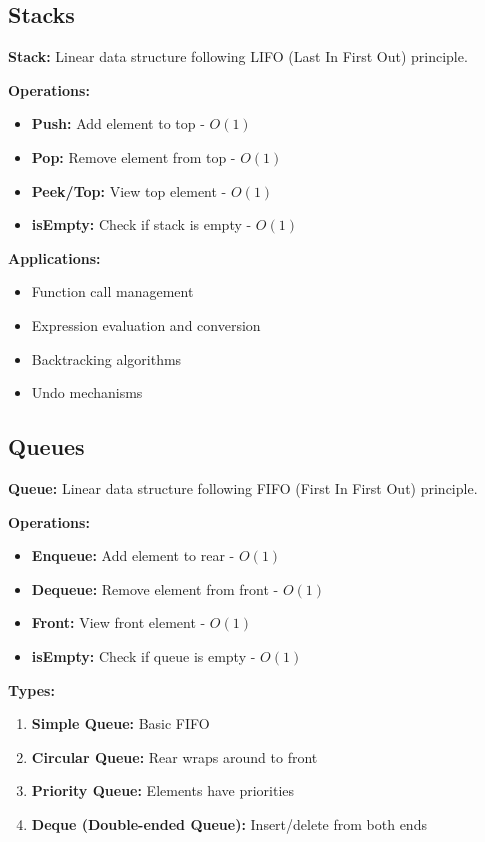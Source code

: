 \documentclass[11pt,a4paper]{article}
\begin{document}
\subsection{Stacks}

\begin{defbox}
\textbf{Stack:} Linear data structure following LIFO (Last In First Out) principle.
\end{defbox}

\textbf{Operations:}
\begin{itemize}
    \item \textbf{Push:} Add element to top - $O(1)$
    \item \textbf{Pop:} Remove element from top - $O(1)$
    \item \textbf{Peek/Top:} View top element - $O(1)$
    \item \textbf{isEmpty:} Check if stack is empty - $O(1)$
\end{itemize}

\textbf{Applications:}
\begin{itemize}
    \item Function call management
    \item Expression evaluation and conversion
    \item Backtracking algorithms
    \item Undo mechanisms
\end{itemize}

\subsection{Queues}

\begin{defbox}
\textbf{Queue:} Linear data structure following FIFO (First In First Out) principle.
\end{defbox}

\textbf{Operations:}
\begin{itemize}
    \item \textbf{Enqueue:} Add element to rear - $O(1)$
    \item \textbf{Dequeue:} Remove element from front - $O(1)$
    \item \textbf{Front:} View front element - $O(1)$
    \item \textbf{isEmpty:} Check if queue is empty - $O(1)$
\end{itemize}

\textbf{Types:}
\begin{enumerate}
    \item \textbf{Simple Queue:} Basic FIFO
    \item \textbf{Circular Queue:} Rear wraps around to front
    \item \textbf{Priority Queue:} Elements have priorities
    \item \textbf{Deque (Double-ended Queue):} Insert/delete from both ends
\end{enumerate}
\end{document}
